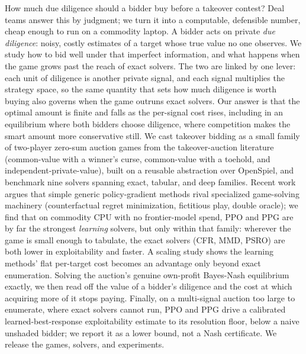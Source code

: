 \documentclass[11pt,a4paper]{article}
\begin{document}
\begin{tcolorbox}[
  colback=sparqcorallight,
  colframe=sparqcoralborder,
  arc=3pt,
  boxrule=1pt,
  left=10pt, right=10pt, top=10pt, bottom=10pt,
  title={\textbf{Abstract}},
  fonttitle=\normalsize,
  coltitle=white,
  colbacktitle=sparqcoral,
  attach boxed title to top left={yshift=-2mm, xshift=5mm},
  boxed title style={arc=2pt, boxrule=0pt}
]
How much due diligence should a bidder buy before a takeover contest? Deal teams answer
this by judgment; we turn it into a computable, defensible number, cheap enough to run on
a commodity laptop. A bidder acts on private \emph{due diligence}: noisy, costly
estimates of a target whose true value no one observes. We study how to bid well under
that imperfect information, and what happens when the game grows past the reach of exact
solvers. The two are linked by one lever: each unit of diligence is another private
signal, and each signal multiplies the strategy space, so the same quantity that sets
how much diligence is worth buying also governs when the game outruns exact solvers. Our
answer is that the optimal amount is finite and falls as the per-signal cost rises,
including in an equilibrium where both bidders choose diligence, where competition makes
the smart amount more conservative still.
We cast takeover bidding as a small family of two-player zero-sum auction games from the
takeover-auction literature (common-value with a winner's curse, common-value with a
toehold, and independent-private-value), built on a reusable abstraction over OpenSpiel,
and benchmark nine solvers spanning exact, tabular, and deep families. Recent work argues
that simple generic policy-gradient methods rival specialized game-solving machinery
(counterfactual regret minimization, fictitious play, double oracle); we find that on
commodity CPU with no frontier-model spend, PPO and PPG are by far the strongest
\emph{learning} solvers, but only within that family: wherever the game is small enough
to tabulate, the exact solvers (CFR, MMD, PSRO) are both lower in exploitability and
faster. A scaling study shows the learning methods' flat per-target cost becomes an
advantage only beyond exact enumeration. Solving the auction's genuine own-profit
Bayes-Nash equilibrium exactly, we then read off the value of a bidder's diligence and
the cost at which acquiring more of it stops paying. Finally, on a multi-signal auction
too large to enumerate, where exact solvers cannot run, PPO and PPG drive a calibrated
learned-best-response exploitability estimate to its resolution floor, below a naive
unshaded bidder; we report it as a lower bound, not a Nash certificate. We release the
games, solvers, and experiments.


\end{tcolorbox}
\end{document}
